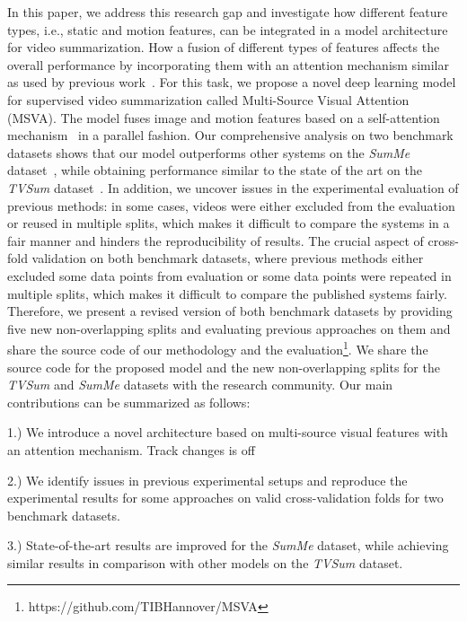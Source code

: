 \documentclass{article}
\begin{document}
In this paper, we address this research gap and investigate how different feature types, i.e., static and motion features, can be integrated in a model architecture for video summarization.
How a fusion of different types of features affects the overall performance by incorporating them with an attention mechanism similar as used by previous work~\cite{DBLP:journals/corr/abs-2006-01410, DBLP:conf/accv/FajtlSAMR18, DBLP:journals/corr/abs-1708-09545,DBLP:conf/wacv/FuTC19}. 
For this task, we propose a novel deep learning model for supervised video summarization called Multi-Source Visual Attention (MSVA). The model fuses image and motion features based on a self-attention mechanism~\cite{DBLP:conf/accv/FajtlSAMR18} in a parallel fashion. Our comprehensive analysis on two benchmark datasets shows that our model outperforms other systems on the \emph{SumMe} dataset~\cite{DBLP:conf/eccv/ZhangCSG16}, while obtaining performance similar to the state of the art on the \emph{TVSum} dataset~\cite{DBLP:conf/cvpr/SongVSJ15}. 
In addition, we uncover issues in the experimental evaluation of previous methods: in some cases, videos were either excluded from the evaluation or reused in multiple splits, which makes it difficult to compare the systems in a fair manner and hinders the reproducibility of results.
The crucial aspect of cross-fold validation on both benchmark datasets, where previous methods either excluded some data points from evaluation or some data points were repeated in multiple splits, which makes it difficult to compare the published systems fairly. 
Therefore, we present a revised version of both benchmark datasets by providing five new non-overlapping splits and evaluating previous approaches on them and share the source code of our methodology and the evaluation\footnote{https://github.com/TIBHannover/MSVA}. 
We share the source code for the proposed model and the new non-overlapping splits for the \emph{TVSum} and \emph{SumMe} datasets with the research community. 
Our main contributions can be summarized as follows:

																																											 

1.)  We introduce a novel architecture based on multi-source visual features with an attention mechanism.
Track changes is off

2.) We identify issues in previous experimental setups and reproduce the experimental results for some approaches on valid cross-validation folds for two benchmark datasets.

3.) State-of-the-art results are improved for the \emph{SumMe} dataset, while achieving similar results in comparison with other models on the \emph{TVSum} dataset.
																																																																																																																																																																											  
\end{document}
